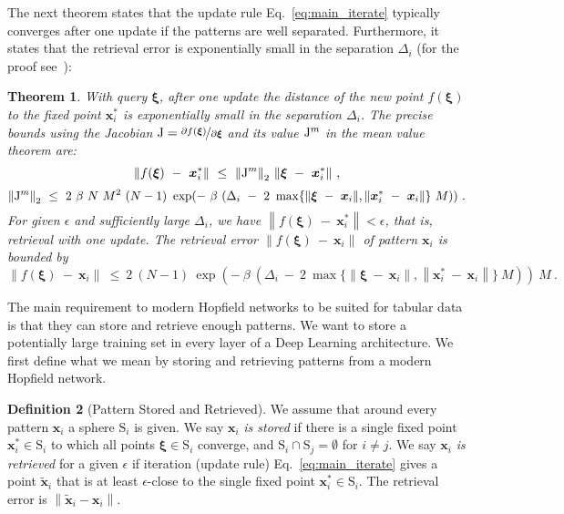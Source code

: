 \documentclass{article}
\theoremstyle{plain}
\newtheorem{theorem}{Theorem}[section]
\theoremstyle{definition}
\newtheorem{definition}[theorem]{Definition}
\theoremstyle{remark}
\newcommand\Bx{\bm{x}}
\newcommand\Bxi{\bm{\xi}}
\newcommand{\rS}{\mathrm{S}} \newcommand{\rT}{\mathrm{T}}
\newcommand{\NRM}[1]{{{\left\| #1\right\|}}}
\begin{document}
The next theorem states that the update rule Eq.~\eqref{eq:main_iterate} typically converges after
one update if the patterns are well separated. Furthermore, it states
that the retrieval error is 
exponentially small in the separation $\Delta_i$ (for the proof see~\mbox{\citep{Ramsauer:21}}):
\begin{theorem}
\label{th:oneUpdate}
With query $\Bxi$, after one update the distance of the new point $f(\Bxi)$
to the fixed point $\Bx_i^*$ is exponentially small in the separation $\Delta_i$.
The precise bounds using the Jacobian $\rJ = \nicefrac{\partial
  f(\Bxi)}{\partial \Bxi}$ and its value $\mathrm{J}^m$ in the mean value
theorem are:
\begin{equation}
  \NRM{f(\Bxi) \ - \ \Bx_i^*}
  \ \leq \  \NRM{\rJ^m}_2 \ \NRM{\Bxi \ - \ \Bx_i^*}  \ ,
\end{equation}
\begin{equation}
  \NRM{\rJ^m}_2  \ \leq \
  2 \ \beta \ N \ M^2 \ (N-1) \ \exp(- \ \beta \
  (\Delta_i \ - \ 2 \
  \max \{ \NRM{\Bxi  \ - \ \Bx_i} , \NRM{\Bx_i^* \ - \ \Bx_i} \}  \ M) )\ .
\end{equation}
For given $\epsilon$ and 
sufficiently large $\Delta_i$, we have $\NRM{f(\Bxi) \ - \ \Bx_i^*} < \epsilon$,
that is, retrieval with one update.
The retrieval error $\NRM{f(\Bxi) \ - \ \Bx_i}$ of pattern $\Bx_i$
is bounded by
\begin{equation}
   \NRM{f(\Bxi) \ - \ \Bx_i} \ \leq \ 2 \ (N-1) \ \exp(- \ \beta \ (\Delta_i \ - \ 2 \ \max \{ \NRM{\Bxi  \ - \ \Bx_i} , \NRM{\Bx_i^* \ - \ \Bx_i} \} \ M) )  \ M  \ .
\end{equation}
\end{theorem}

The main requirement to modern Hopfield networks to
be suited for tabular data is that they can store and retrieve enough patterns.
We want to store a potentially large training set in every layer
of a Deep Learning architecture.
We first define what we mean by storing and retrieving patterns
from a modern Hopfield network.
\begin{definition}[Pattern Stored and Retrieved]
We assume that around every pattern $\Bx_i$ a sphere $\rS_i$ is given.
We say $\Bx_i$ {\em is stored} if there is a single fixed point $\Bx_i^* \in \rS_i$ to
which all points $\Bxi \in \rS_i$ converge,
and  $\rS_i \cap \rS_j = \emptyset$ for $i \not= j$.
We say $\Bx_i$ {\em is retrieved} for a given $\epsilon$ if 
iteration (update rule) Eq.~\eqref{eq:main_iterate} gives
a point $\tilde{\Bx}_i$ that is at least 
$\epsilon$-close to the single fixed point $\Bx_i^* \in \rS_i$. 
The retrieval error is $\NRM{\tilde{\Bx}_i - \Bx_i}$.
\end{definition}
\end{document}
